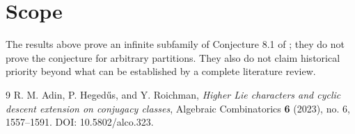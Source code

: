 \documentclass[11pt]{article}
\begin{document}
\section{Scope}
The results above prove an infinite subfamily of Conjecture 8.1 of \cite{AHR}; they do not prove the conjecture for arbitrary partitions. They also do not claim historical priority beyond what can be established by a complete literature review.

\begin{thebibliography}{9}
R. M. Adin, P. Heged\H{u}s, and Y. Roichman,
\emph{Higher Lie characters and cyclic descent extension on conjugacy classes},
Algebraic Combinatorics \textbf{6} (2023), no. 6, 1557--1591.
DOI: 10.5802/alco.323.
\end{thebibliography}
\end{document}

